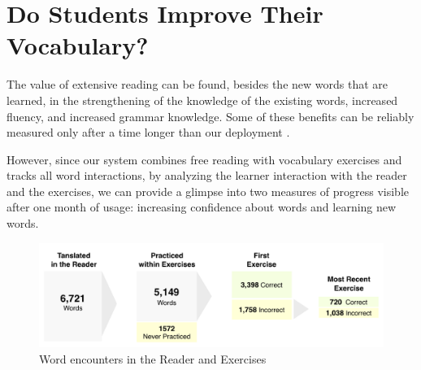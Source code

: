 
\newpage
\section{Do Students Improve Their Vocabulary?}

  The value of extensive reading can be found, besides the new words that are learned, in the strengthening of the knowledge of the existing words, increased fluency, and increased grammar knowledge. Some of these benefits can be reliably measured only after a time longer than our deployment \cite{renadya07-power}. 

  However, since our system combines free reading with vocabulary exercises and tracks all word interactions, by analyzing the learner interaction with the reader and the exercises, we can provide a glimpse into two measures of progress visible after one month of usage: increasing confidence about words and learning new words. 

   \begin{figure}[h!]
  \centering
    \includegraphics[width=0.9\columnwidth,trim={0 15 0 15},clip]{figures/word-learning-flow.pdf}
    \caption{Word encounters in the Reader and Exercises}
    \label{fig:word_learning_flow}
  \end{figure}

